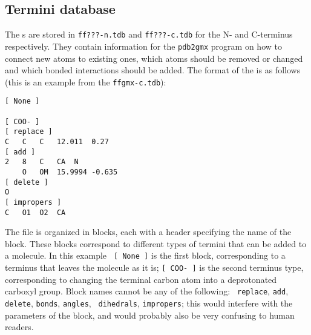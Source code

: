 \subsection{Termini database}
The s are stored in {\tt ff???-n.tdb} and
{\tt ff???-c.tdb} for the N- and C-terminus respectively. They contain
information for the {\tt pdb2gmx} program on how to connect new atoms
to existing ones, which atoms should be removed or changed and which
bonded interactions should be added. The format of the is as follows
(this is an example from the {\tt ffgmx-c.tdb}):
%
{\small\begin{verbatim}
[ None ]

[ COO- ]
[ replace ]
C	C	C	12.011	0.27
[ add ]
2	8	C	CA	N
	O	OM	15.9994	-0.635
[ delete ]
O
[ impropers ]
C	O1	O2	CA
\end{verbatim}
}

The file is organized in blocks, each with a header specifying the
name of the block. These blocks correspond to different types of
termini that can be added to a molecule. In this example {\tt
[~None~]} is the first block, corresponding to a terminus that leaves
the molecule as it is; {\tt [~COO-~]} is the second terminus type,
corresponding to changing the terminal carbon atom into a deprotonated
carboxyl group. Block names cannot be any of the following: {\tt
replace}, {\tt add}, {\tt delete}, {\tt bonds}, {\tt angles}, {\tt
dihedrals}, {\tt impropers}; this would interfere with the parameters
of the block, and would probably also be very confusing to human
readers.

